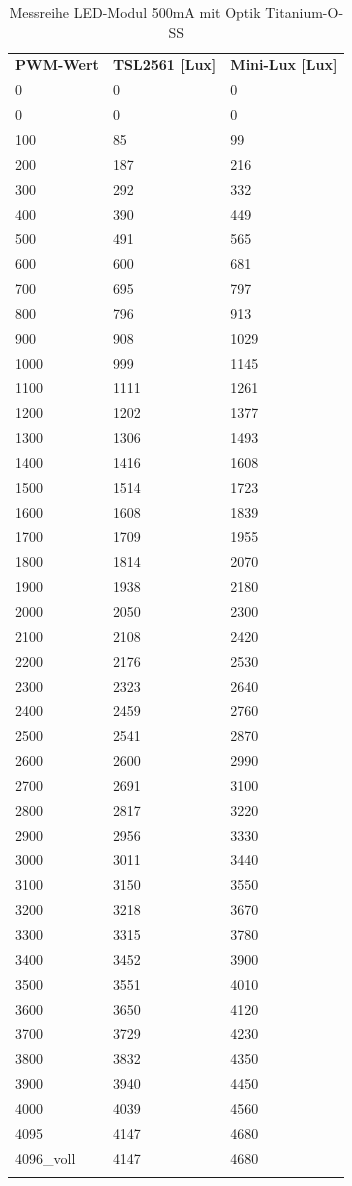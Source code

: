 \documentclass[a4paper,12pt]{scrartcl}
\begin{document}
\begin{longtable}{p{35mm}>{\columncolor[gray]{0.97}}p{35mm}p{35mm}}
  \rowcolor[gray]{.9}
    \textbf{PWM-Wert} & \textbf{TSL2561 [Lux]} & \textbf{Mini-Lux [Lux]} \\ 
0 & 0 & 0 \\
0	&	0	&	0	\\
100	&	85	&	99	\\
200	&	187	&	216	\\
300	&	292	&	332	\\
400	&	390	&	449	\\
500	&	491	&	565	\\
600	&	600	&	681	\\
700	&	695	&	797	\\
800	&	796	&	913	\\
900	&	908	&	1029	\\
1000	&	999	&	1145	\\
1100	&	1111	&	1261	\\
1200	&	1202	&	1377	\\
1300	&	1306	&	1493	\\
1400	&	1416	&	1608	\\
1500	&	1514	&	1723	\\
1600	&	1608	&	1839	\\
1700	&	1709	&	1955	\\
1800	&	1814	&	2070	\\
1900	&	1938	&	2180	\\
2000	&	2050	&	2300	\\
2100	&	2108	&	2420	\\
2200	&	2176	&	2530	\\
2300	&	2323	&	2640	\\
2400	&	2459	&	2760	\\
2500	&	2541	&	2870	\\
2600	&	2600	&	2990	\\
2700	&	2691	&	3100	\\
2800	&	2817	&	3220	\\
2900	&	2956	&	3330	\\
3000	&	3011	&	3440	\\
3100	&	3150	&	3550	\\
3200	&	3218	&	3670	\\
3300	&	3315	&	3780	\\
3400	&	3452	&	3900	\\
3500	&	3551	&	4010	\\
3600	&	3650	&	4120	\\
3700	&	3729	&	4230	\\
3800	&	3832	&	4350	\\
3900	&	3940	&	4450	\\
4000	&	4039	&	4560	\\
4095	&	4147	&	4680	\\
4096\_voll	&	4147	&	4680	\\
\caption{Messreihe LED-Modul 500mA mit Optik Titanium-O-SS}
\label{tab:500maTitSS}
\end{longtable}
\end{document}
